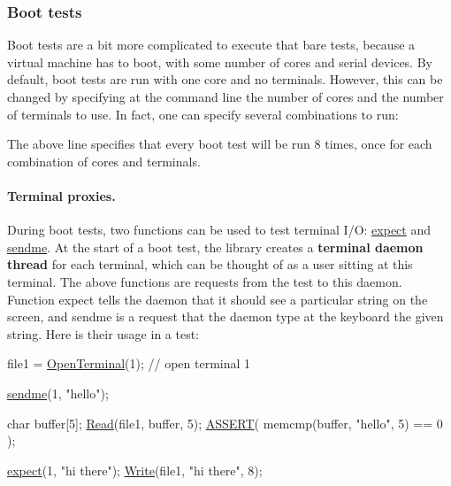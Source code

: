 \subsubsection*{Boot tests }

Boot tests are a bit more complicated to execute that bare tests, because a virtual machine has to boot, with some number of cores and serial devices. By default, boot tests are run with one core and no terminals. However, this can be changed by specifying at the command line the number of cores and the number of terminals to use. In fact, one can specify several combinations to run\-: 
 The above line specifies that every boot test will be run 8 times, once for each combination of cores and terminals.

\paragraph*{Terminal proxies.}

During boot tests, two functions can be used to test terminal I/\-O\-: \hyperlink{group__Testing_ga0c4e801b8c3317b802fa4e80e1e26de2}{expect} and \hyperlink{group__Testing_ga0f97d30c4cd1370bcac6d7f4775d6789}{sendme}. At the start of a boot test, the library creates a {\bfseries terminal daemon thread} for each terminal, which can be thought of as a user sitting at this terminal. The above functions are requests from the test to this daemon. Function {\ttfamily expect} tells the daemon that it should see a particular string on the screen, and {\ttfamily sendme} is a request that the daemon type at the keyboard the given string. Here is their usage in a test\-: 
\begin{DoxyCode}
file1 = \hyperlink{group__syscalls_ga6ea2b586a8dfcfc1e7065e1664a0fb35}{OpenTerminal}(1);     \textcolor{comment}{// open terminal 1}

\hyperlink{group__Testing_ga0f97d30c4cd1370bcac6d7f4775d6789}{sendme}(1, \textcolor{stringliteral}{"hello"});

\textcolor{keywordtype}{char} buffer[5];
\hyperlink{group__syscalls_ga3e9dc545a789eb45b2d356eabbac3ee3}{Read}(file1, buffer, 5); 
\hyperlink{group__Testing_ga28301f76c53b643912da7c538f74e2c6}{ASSERT}( memcmp(buffer, \textcolor{stringliteral}{"hello"}, 5) == 0 );

\hyperlink{group__Testing_ga0c4e801b8c3317b802fa4e80e1e26de2}{expect}(1, \textcolor{stringliteral}{"hi there"});
\hyperlink{group__syscalls_gaf046f003fde24f79fb395c250137856c}{Write}(file1, \textcolor{stringliteral}{"hi there"}, 8);
\end{DoxyCode}


